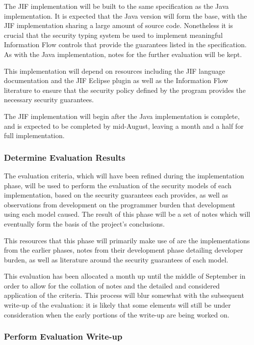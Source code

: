 The JIF implementation will be built to the same specification as the Java implementation. It is expected that the Java version will form the base, with the JIF implementation sharing a large amount of source code. Nonetheless it is crucial that the security typing system be used to implement meaningful Information Flow controls that provide the guarantees listed in the specification. As with the Java implementation, notes for the further evaluation will be kept.

This implementation will depend on resources including the JIF language documentation and the JIF Eclipse plugin as well as the Information Flow literature to ensure that the security policy defined by the program provides the necessary security guarantees.

The JIF implementation will begin after the Java implementation is complete, and is expected to be completed by mid-August, leaving a month and a half for full implementation.

\subsubsection{Determine Evaluation Results}

The evaluation criteria, which will have been refined during the implementation phase, will be used to perform the evaluation of the security models of each implementation, based on the security guarantees each provides, as well as observations from development on the programmer burden that development using each model caused. The result of this phase will be a set of notes which will eventually form the basis of the project's conclusions.

This resources that this phase will primarily make use of are the implementations from the earlier phases, notes from their development phase detailing developer burden, as well as literature around the security guarantees of each model.

This evaluation has been allocated a month up until the middle of September in order to allow for the collation of notes and the detailed and considered application of the criteria. This process will blur somewhat with the subsequent write-up of the evaluation: it is likely that some elements will still be under consideration when the early portions of the write-up are being worked on.

\subsubsection{Perform Evaluation Write-up}

